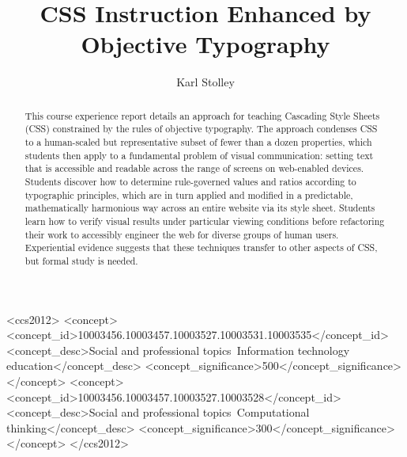 \documentclass[sigplan,screen]{acmart}
\begin{document}
\title[Objective Typography]{CSS Instruction Enhanced by Objective Typography}

\author{Karl Stolley}

\begin{abstract}
This course experience report details an approach for teaching Cascading Style Sheets (CSS) constrained by the rules of objective typography. The approach condenses CSS to a human-scaled but representative subset of fewer than a dozen properties, which students then apply to a fundamental problem of visual communication: setting text that is accessible and readable across the range of screens on web-enabled devices. Students discover how to determine rule-governed values and ratios according to typographic principles, which are in turn applied and modified in a predictable, mathematically harmonious way across an entire website via its style sheet. Students learn how to verify visual results under particular viewing conditions before refactoring their work to accessibly engineer the web for diverse groups of human users. Experiential evidence suggests that these techniques transfer to other aspects of CSS, but formal study is needed.
\end{abstract}

\begin{CCSXML}
<ccs2012>
<concept>
  <concept_id>10003456.10003457.10003527.10003531.10003535</concept_id>
  <concept_desc>Social and professional topics~Information technology education</concept_desc>
  <concept_significance>500</concept_significance>
</concept>
<concept>
  <concept_id>10003456.10003457.10003527.10003528</concept_id>
  <concept_desc>Social and professional topics~Computational thinking</concept_desc>
  <concept_significance>300</concept_significance>
</concept>
</ccs2012>
\end{CCSXML}




\maketitle
\end{document}

